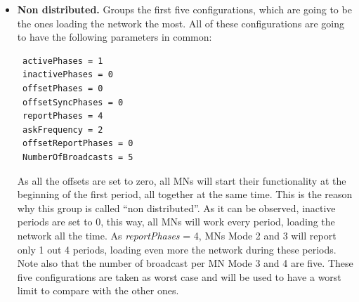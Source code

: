 \begin{itemize}
 \item \textbf{Non distributed. }Groups the first five configurations, which are going to be the ones loading the network the most. All of these
configurations are going to have the following parameters in common:
\begin{verbatim}
 activePhases = 1
 inactivePhases = 0
 offsetPhases = 0
 offsetSyncPhases = 0
 reportPhases = 4 
 askFrequency = 2
 offsetReportPhases = 0
 NumberOfBroadcasts = 5
\end{verbatim}
As all the offsets are set to zero, all \acp{MN} will start their functionality at the beginning of the first period, all together at the same
time. This is the reason why this group is called ``non distributed''. As it can be observed, inactive periods are set to 0, this way, all \acp{MN} will 
work every period, loading the network all the time. As \textit{reportPhases} = 4, \acp{MN} Mode 2 and 3 will report only 1 out 4 periods, loading even
more the network during these periods. Note also that the number of broadcast per \ac{MN} Mode 3 and 4 are five. These five configurations are taken as
worst case and will be used to have a worst limit to compare with the other ones.


\end{itemize}
